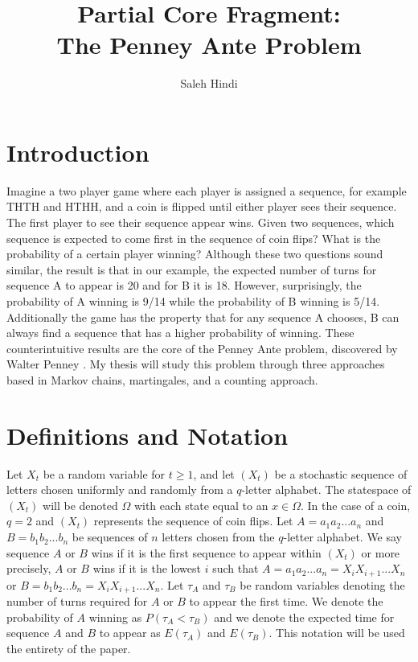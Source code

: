 \documentclass{article}
\numberwithin{mytheorem}{subsection} %
\begin{document}
	\title{Partial Core Fragment: \\ The Penney Ante Problem}
	\author{Saleh Hindi}

	\maketitle

	\section{Introduction}
		Imagine a two player game where
		each player is assigned a sequence, for example THTH and HTHH, and a coin is flipped until either player sees their sequence.
		The first player to see their sequence appear wins.
		Given two sequences, which sequence is expected to come first in the
		sequence of coin flips? What is the probability of a certain player winning? Although these two
		questions sound similar, the result is that in our example,
		the expected number of turns for sequence A to appear is 20 and for B it is 18. However, surprisingly, the probability
		of A winning is 9/14 while the probability of B winning is 5/14. Additionally the game has the property
		that for any sequence A chooses, B can always find a sequence that has a higher probability of winning.
		These counterintuitive results are the core of the Penney Ante problem, discovered by Walter Penney
		\cite{gardner}. My thesis will study this problem through three approaches based in Markov chains, martingales,
		and a counting approach.

	\section{Definitions and Notation}
		Let $X_t$ be a random variable for $t \geq 1$, and let $(X_t)$ be a stochastic sequence of letters chosen uniformly and
		randomly from a $q$-letter alphabet. The statespace of $(X_t)$ will be denoted $\Omega$ with each state equal to an $x \in \Omega$. In the case of a coin, $q=2$ and $(X_t)$ represents the sequence of coin flips. Let $A=a_1a_2...a_n$ and $B=b_1b_2...b_n$ be sequences
		of $n$ letters chosen from the $q$-letter alphabet. We say
		sequence $A$ or $B$ wins if it is the first sequence to appear within $(X_t)$ or more precisely, $A$ or $B$ wins if it is the lowest $i$ such that $A = a_1a_2...a_n = X_iX_{i+1}...X_n$ or $B = b_1b_2...b_n = X_iX_{i+1}...X_n$. Let $\tau_A$ and $\tau_B$ be random variables denoting
		the number of turns required for $A$ or $B$ to appear the first time. We denote
		the probability of $A$ winning as $P(\tau_A < \tau_B)$ and we denote the expected time for sequence
		$A$ and $B$ to appear as $E(\tau_A)$ and $E(\tau_B)$. This notation will be used the entirety of the paper. 
\end{document}
